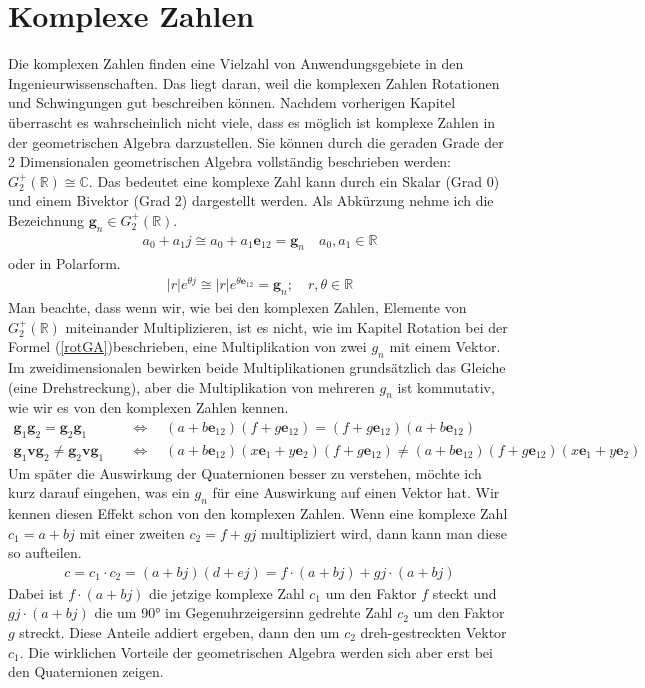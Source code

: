 %
%
%
\section{Komplexe Zahlen}

Die komplexen Zahlen finden eine Vielzahl von Anwendungsgebiete in den Ingenieurwissenschaften. Das liegt daran, weil die komplexen Zahlen Rotationen und Schwingungen gut beschreiben können. Nachdem vorherigen Kapitel überrascht es wahrscheinlich nicht viele, dass es möglich ist komplexe Zahlen in der geometrischen Algebra darzustellen. Sie können durch die geraden Grade der 2 Dimensionalen geometrischen Algebra vollständig beschrieben werden: $G_2^+(\mathbb{R}) \cong \mathbb{C}$. Das bedeutet eine komplexe Zahl kann durch ein Skalar (Grad 0) und einem Bivektor (Grad 2) dargestellt werden. Als Abkürzung nehme ich die Bezeichnung $\mathbf{g}_n \in  G_2^+(\mathbb{R})$.
\begin{align}
	a_0 + a_1 j \cong a_0 + a_1 \mathbf{e}_{12} = \mathbf{g}_n\quad a_0, a_1 \in \mathbb{R}
\end{align}
oder in Polarform.
\begin{align}
	|r|e^{\theta j} \cong |r|e^{\theta \mathbf{e}_{12}} = \mathbf{g}_n; \quad r, \theta \in \mathbb{R}
\end{align}
Man beachte, dass wenn wir, wie bei den komplexen Zahlen, Elemente von $G_2^+(\mathbb{R})$ miteinander Multiplizieren, ist es nicht, wie im Kapitel Rotation bei der Formel (\ref{rotGA})beschrieben, eine Multiplikation von zwei $g_n$ mit einem Vektor. Im zweidimensionalen bewirken beide Multiplikationen grundsätzlich das Gleiche (eine Drehstreckung), aber die Multiplikation von mehreren $g_n$ ist kommutativ, wie wir es von den komplexen Zahlen kennen.
\begin{align}
	\mathbf{g}_1\mathbf{g}_2 = \mathbf{g}_2\mathbf{g}_1 \quad&\Leftrightarrow\quad (a + b \mathbf{e}_{12})(f + g \mathbf{e}_{12}) = (f + g \mathbf{e}_{12})(a + b \mathbf{e}_{12})\\
	\mathbf{g}_1\mathbf{v}\mathbf{g}_2\not= \mathbf{g}_2\mathbf{v}\mathbf{g}_1 \quad&\Leftrightarrow\quad(a + b \mathbf{e}_{12})(x\mathbf{e}_1+y\mathbf{e}_2)(f + g \mathbf{e}_{12}) \not= (a + b \mathbf{e}_{12})(f + g \mathbf{e}_{12})(x\mathbf{e}_1+y\mathbf{e}_2)
\end{align}
Um später die Auswirkung der Quaternionen besser zu verstehen, möchte ich kurz darauf eingehen, was ein $g_n$ für eine Auswirkung auf einen Vektor hat.
Wir kennen diesen Effekt schon von den komplexen Zahlen. Wenn eine komplexe Zahl $c_1=a+bj$ mit einer zweiten $c_2=f+gj$ multipliziert wird, dann kann man diese so aufteilen.
\begin{align}
	c = c_1\cdot c_2 = (a + bj)(d + ej) = f\cdot(a+bj) + gj\cdot(a+bj)
\end{align}
Dabei ist $f\cdot(a+bj)$ die jetzige komplexe Zahl $c_1$ um den Faktor $f$ steckt und $gj\cdot(a+bj)$ die um 90° im Gegenuhrzeigersinn gedrehte Zahl $c_2$ um den Faktor $g$ streckt. Diese Anteile addiert ergeben, dann den um $c_2$ dreh-gestreckten Vektor $c_1$. Die wirklichen Vorteile der geometrischen Algebra werden sich aber erst bei den Quaternionen zeigen.